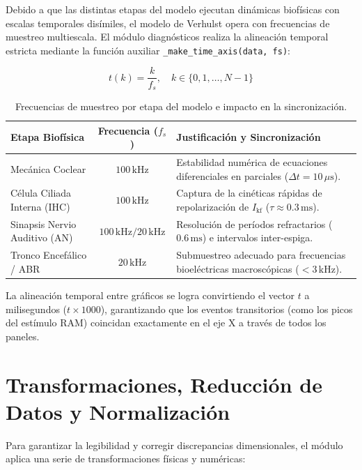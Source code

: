 \documentclass[12pt,a4paper]{article}
\begin{document}
Debido a que las distintas etapas del modelo ejecutan dinámicas biofísicas con escalas temporales disímiles, el modelo de Verhulst opera con frecuencias de muestreo multiescala. El módulo diagnósticos realiza la alineación temporal estricta mediante la función auxiliar \texttt{\_make\_time\_axis(data, fs)}:

\begin{equation}
t(k) = \frac{k}{f_s}, \quad k \in \{0, 1, \dots, N-1\}
\end{equation}

\begin{table}[H]
\centering
\caption{Frecuencias de muestreo por etapa del modelo e impacto en la sincronización.}
\label{tab:frecuencias}
\begin{tabular}{l c p{8cm}}
\toprule
\textbf{Etapa Biofísica} & \textbf{Frecuencia ($f_s$)} & \textbf{Justificación y Sincronización} \\
\midrule
Mecánica Coclear & $100\,\text{kHz}$ & Estabilidad numérica de ecuaciones diferenciales en parciales ($\Delta t = 10\,\mu\text{s}$). \\
Célula Ciliada Interna (IHC) & $100\,\text{kHz}$ & Captura de la cinéticas rápidas de repolarización de $I_{\text{kf}}$ ($\tau \approx 0.3\,\text{ms}$). \\
Sinapsis Nervio Auditivo (AN) & $100\,\text{kHz} / 20\,\text{kHz}$ & Resolución de períodos refractarios ($0.6\,\text{ms}$) e intervalos inter-espiga. \\
Tronco Encefálico / ABR & $20\,\text{kHz}$ & Submuestreo adecuado para frecuencias bioeléctricas macroscópicas ($< 3\,\text{kHz}$). \\
\bottomrule
\end{tabular}
\end{table}

La alineación temporal entre gráficos se logra convirtiendo el vector $t$ a milisegundos ($t \times 1000$), garantizando que los eventos transitorios (como los picos del estímulo RAM) coincidan exactamente en el eje X a través de todos los paneles.

\section{Transformaciones, Reducción de Datos y Normalización}

Para garantizar la legibilidad y corregir discrepancias dimensionales, el módulo aplica una serie de transformaciones físicas y numéricas:
\end{document}
